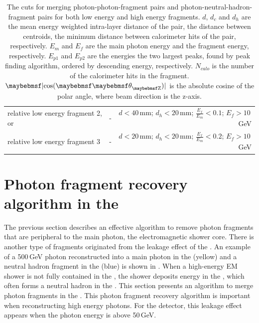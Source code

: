 \begin{table}[htbp]
\begin{tabular}{l  r  r }
\multicolumn{1}{L{0.3\textwidth}}{relative low energy fragment 2, or} & \multicolumn{1}{R{0.3\textwidth}}{-}  & \multicolumn{1}{R{0.3\textwidth}}{$d < 40$\,mm; $d_h < 20$\,mm; $\frac{E_f}{E_m} < 0.1$; $E_f > 10$\,GeV} \\
\multicolumn{1}{L{0.3\textwidth}}{relative low energy fragment 3} & \multicolumn{1}{R{0.3\textwidth}}{-}  & \multicolumn{1}{R{0.3\textwidth}}{$d < 20$\,mm; $d_h < 20$\,mm; $\frac{E_f}{E_m} < 0.2$; $E_f > 10$\,GeV} \\
\hline
\hline
\end{tabular}

\caption[The cuts for photon fragment removal algorithm in the \ECAL.]%
{The cuts for merging photon-photon-fragment pairs and photon-neutral-hadron-fragment pairs for both low energy and high energy fragments. $d$, $d_c$ and $d_h$ are the mean energy weighted intra-layer distance of the pair, the distance between centroids, the minimum distance between calorimeter hits of the pair, respectively. $E_m$ and $E_f$ are the main photon energy and the fragment energy, respectively. $E_{p1}$ and $E_{p2}$ are the energies the two largest peaks, found by peak finding algorithm, ordered by descending energy, respectively. $N_{calo}$ is the number of the calorimeter hits in the fragment. $\absCosTheta$ is the absolute cosine of the polar angle, where beam direction is the z-axis.}
\label{tab:photonFragRemovalCuts}
\end{table}


\section{Photon fragment recovery algorithm in the \HCAL}
\label{sec:photonHighEFragRemoval}

The previous section describes an effective algorithm to remove photon fragments that are peripheral to the main photon, the electromagnetic shower core. There is another type of fragments originated from the leakage effect of the \ECAL. An example of a 500\,GeV photon reconstructed into a main photon in the \ECAL (yellow) and a neutral hadron fragment in the \HCAL (blue) is shown in .  
When a high-energy EM shower is not fully contained in the \ECAL, the shower deposits energy in the \HCAL, which often forms a neutral hadron in the \HCAL. This section presents an algorithm to merge photon fragments in the \HCAL. This photon fragment recovery algorithm is important when reconstructing  high energy photons. For the \ILD detector, this \ECAL leakage effect appears when the photon energy is above 50\,GeV.




